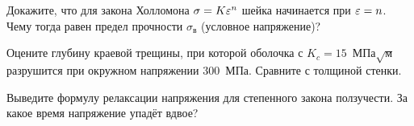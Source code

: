 \begin{exercise}
Докажите, что для закона Холломона $\sigma = K\varepsilon^n$ шейка начинается при $\varepsilon = n$. Чему тогда равен предел прочности
$\sigma_{\text{в}}$ (условное напряжение)?
\end{exercise}

\begin{exercise}
Оцените глубину краевой трещины, при которой оболочка с $K_c = 15$~МПа$\sqrt{\text{м}}$ разрушится при окружном
напряжении 300~МПа. Сравните с толщиной стенки.
\end{exercise}

\begin{exercise}
Выведите формулу релаксации напряжения для степенного закона ползучести. За какое время напряжение упадёт вдвое?
\end{exercise}
